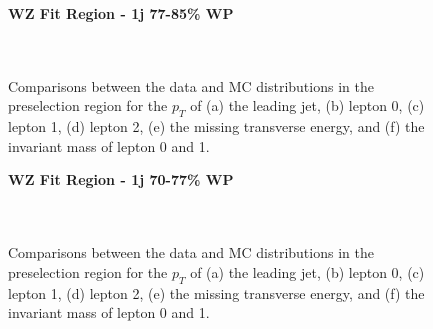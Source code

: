 \begin{figure}[h]
    \centering
    \textbf{WZ Fit Region - 1j 77-85\% WP}\\
    \\
    \\
    \caption{Comparisons between the data and MC distributions in the preselection region for the $p_T$ of (a) the leading jet, (b) lepton 0, (c) lepton 1, (d) lepton 2, (e) the missing transverse energy, and (f) the invariant mass of lepton 0 and 1.}
    \label{kin:WP_1j_77_85}
\end{figure}

\begin{figure}[h]
    \centering
    \textbf{WZ Fit Region - 1j 70-77\% WP}\\
    \\
    \\
    \caption{Comparisons between the data and MC distributions in the preselection region for the $p_T$ of (a) the leading jet, (b) lepton 0, (c) lepton 1, (d) lepton 2, (e) the missing transverse energy, and (f) the invariant mass of lepton 0 and 1.}
    \label{kin:WP_1j_70_77}   
\end{figure}


